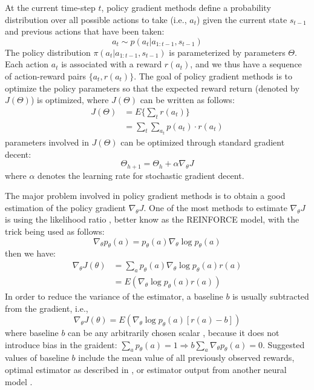 At the current time-step $t$,
policy gradient methods define a probability distribution over all possible actions  to take (i.e., $a_t$) given the current state $s_{t-1}$ and previous actions that have been taken: 
\begin{equation}
a_t\sim p(a_t|a_{1:t-1},s_{t-1})
\end{equation}
The policy distribution $\pi(a_t|a_{1:t-1},s_{t-1})$ is parameterized by  parameters $\Theta$. 
Each action $a_t$ is associated with a reward $r(a_t)$, and we thus have a sequence of action-reward pairs $\{a_t, r(a_t)\}$. 
The goal of policy gradient methods is to optimize the policy parameters so that the expected reward return (denoted by $J(\Theta)$) is optimized, where $J(\Theta)$
can be written as follows:
 \begin{equation}
 \begin{aligned}
 J(\Theta)&=E\{\sum_t r(a_t) \}\\
 &=\sum_t \sum_{a_t}p(a_t)\cdot r(a_t)
\end{aligned}
 \end{equation}
 parameters involved in $ J(\Theta)$ can be optimized through standard gradient decent: 
 \begin{equation}
 \Theta_{h+1}= \Theta_{h}+\alpha \nabla_{\theta} J
 \end{equation}
 where $\alpha$ denotes the learning rate for stochastic gradient decent. 
 
 The major problem involved in policy gradient methods is to obtain a good estimation of the policy gradient $ \nabla_{\theta} J$. One of the most methods to 
 estimate $ \nabla_{\theta} J$ is using the likelihood ratio \cite{glynn1990likelihood,williams1992simple}, better know as the REINFORCE model, with the trick being used 
 as follows:
 \begin{equation}
 \nabla_{\theta} p_{\theta}(a)=p_{\theta}(a) \nabla_{\theta} \log p_{\theta}(a) 
 \end{equation}
 then we have:
  \begin{equation}
  \begin{aligned}
  \nabla_{\theta} J(\theta)&=\sum_a p_{\theta}(a)\nabla_{\theta}\log p_{\theta}(a)r(a) \\
  &=E(\nabla_{\theta}\log p_{\theta}(a)r(a) )
  \end{aligned}
 \end{equation}
In order to reduce the variance of the estimator, a baseline $b$ is usually subtracted from the gradient, i.e., 
  \begin{equation}
  \nabla_{\theta} J(\theta)=E(\nabla_{\theta}\log p_{\theta}(a) [r(a)-b] )
 \end{equation}
where baseline $b$ can be any arbitrarily chosen scalar \cite{williams1992simple}, because it does not introduce bias in the graident:
$\sum_a p_{\theta}(a)=1 \Rightarrow b\sum_a \nabla_{\theta} p_{\theta}(a)=0$. 
Suggested values of baseline $b$ include the mean value of all previously observed rewards,  
optimal estimator as described in
, or estimator output from another neural model \cite{zaremba2015reinforcement,ranzato2015sequence}.

